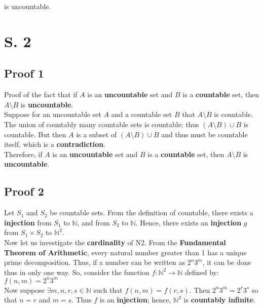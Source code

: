 \documentclass[11pt]{article}
\begin{document}
\noindent is uncountable.

\section*{S. 2}

\subsection*{Proof 1}
Proof of the fact that if $A$ is an \textbf{uncountable} set and $B$ is a \textbf{countable} set, then $A \setminus B$ is \textbf{uncountable}.\\

Suppose for an uncountable set $A$ and a countable set $B$ that $A \setminus B$ is countable. The union of countably many countable sets is countable; thus $(A \setminus B) \cup B$ is countable. But then $A$ is a subset of $(A \setminus B) \cup B$ and thus must be countable itself, which is a \textbf{contradiction}.\\

Therefore, if $A$ is an \textbf{uncountable} set and $B$ is a \textbf{countable} set, then $A \setminus B$ is \textbf{uncountable}.

\subsection*{Proof 2}

Let $S_1$ and $S_2$ be countable sets. From the definition of countable, there exists a \textbf{injection} from $S_1$ to $\mathbb{N}$, and from $S_2$ to $\mathbb{N}$. Hence, there exists an \textbf{injection} $g$ from $S_1 \times S_2$ to $\mathbb{N}^2$.\\

\noindent Now let us investigate the \textbf{cardinality} of N2. From the \textbf{Fundamental Theorem of Arithmetic}, every natural number greater than 1 has a unique prime decomposition. Thus, if a number can be written as $2^n 3^m$, it can be done thus in only one way. So, consider the function $f : \mathbb{N}^2 \rightarrow \mathbb{N}$ defined by:\\

$f(n, m) = 2^n 3^m$\\

\noindent Now suppose $\exists m,n,r,s \in \mathbb{N}$ such that $f(n, m) = f(r, s)$. Then $2^n 3^m = 2^r 3^s$ so that $n = r$ and $m = s$. Thus $f$ is an \textbf{injection}; hence, $\mathbb{N}^2$ is \textbf{countably infinite}.\\
\end{document}
